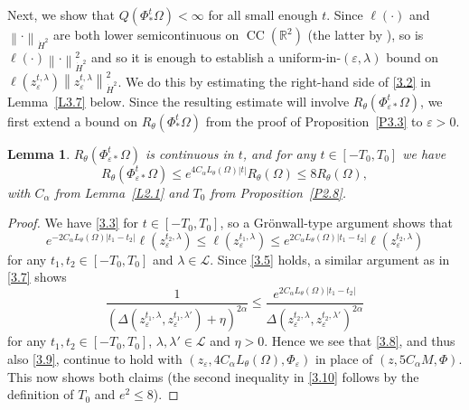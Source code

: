\documentclass[reqno,centertags,12pt]{amsart}
\newtheorem{lemma}[theorem]{Lemma}
\theoremstyle{definition}
\numberwithin{equation}{section}
\newcommand{\abs}[1]{\left\lvert#1\right\rvert}
\newcommand{\norm}[1]{\left\|#1\right\|}
\newcommand{\bbR}{{\mathbb{R}}}
\newcommand{\eps}{\varepsilon}
\newcommand{\tht}{\theta}
\begin{document}
Next, we show that $Q(\Phi_{*}^{t}\Omega) < \infty$ for all small enough $t$.
Since $ \ell(\cdot)$ and $\norm{\cdot}_{\dot{H}^{2}}$ are both lower semicontinuous on $\operatorname{CC}(\bbR^{2})$ (the latter by \cite[Corollary~B.3]{JeoZlaTouching}), so is $\ell(\cdot)\norm{\cdot}_{\dot{H}^{2}}^{2}$ and so
it is enough to establish a uniform-in-$(\eps,\lambda)$ bound on
$\ell(z_{\eps}^{t,\lambda})\norm{z_{\eps}^{t,\lambda}}_{\dot{H}^{2}}^{2}$.
We do this by estimating the right-hand side of \eqref{3.2}
in Lemma~\ref{L3.7} below. Since the resulting estimate will involve
$R_{\tht}(\Phi_{\eps*}^{t}\Omega)$, we first extend a bound on $R_{\tht}(\Phi_{*}^{t}\Omega)$ from the proof of Proposition~\ref{P3.3} to $\eps>0$.

\begin{lemma}\label{L3.4}
    $R_{\tht}(\Phi_{\eps*}^{t}\Omega)$ is continuous in $t$, and for any $t\in[-T_{0},T_{0}]$ we have
    \begin{equation}\label{3.10}
        R_{\tht}(\Phi_{\eps*}^{t}\Omega) \leq e^{4C_{\alpha}L_{\tht}(\Omega)\abs{t}}R_{\tht}(\Omega)
        \leq 8R_{\tht}(\Omega),
    \end{equation}
  with    $C_{\alpha}$ from Lemma~\ref{L2.1} and $T_{0}$ from Proposition~\ref{P2.8}.
\end{lemma}

\begin{proof}
    We have \eqref{3.3} for $t\in[-T_{0},T_{0}]$, so a Gr\"{o}nwall-type argument shows that
    \[
        e^{-2C_{\alpha}L_{\tht}(\Omega)\abs{t_{1} - t_{2}}}\ell(z_{\eps}^{t_{2},\lambda})
        \leq \ell(z_{\eps}^{t_{1},\lambda}) \leq
        e^{2C_{\alpha}L_{\tht}(\Omega)\abs{t_{1} - t_{2}}}\ell(z_{\eps}^{t_{2},\lambda})
    \]
    for any $t_{1},t_{2}\in[-T_{0},T_{0}]$ and $\lambda\in\mathcal{L}$.
    Since \eqref{3.5} holds, a similar argument as in \eqref{3.7} shows
    \[
        \frac{1}{\left(
            \Delta(z_{\eps}^{t_{1},\lambda},z_{\eps}^{t_{1},\lambda'}) + \eta
        \right)^{2\alpha}}
        \leq \frac{e^{2C_{\alpha}L_{\tht}(\Omega)\abs{t_{1} - t_{2}}}}
        {\Delta(z_{\eps}^{t_{2},\lambda},z_{\eps}^{t_{2},\lambda'})^{2\alpha}}
    \]
    for any $t_{1},t_{2}\in[-T_{0},T_{0}]$, $\lambda,\lambda'\in\mathcal{L}$ and $\eta>0$.
    Hence we see that \eqref{3.8}, and thus also \eqref{3.9}, continue to hold with
    $(z_{\eps},4C_{\alpha}L_{\tht}(\Omega),\Phi_{\eps})$ in place of $(z,5C_{\alpha}M,\Phi)$.
    This now shows both claims 
    (the second inequality in \eqref{3.10} follows by the definition of $T_{0}$
    and $e^{2}\leq 8$).
\end{proof}
\end{document}
